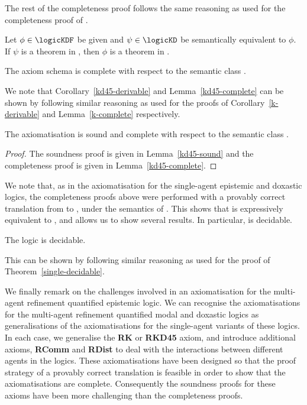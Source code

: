 The rest of the completeness proof follows the same reasoning as used for the
completeness proof of \axiomKF{}.

\begin{corollary}\label{kd45-derivable}
Let $\phi \in \logicKDF$ be given and $\psi \in \logicKD$ be semantically
equivalent to $\phi$.  If $\psi$ is a theorem in \logicKD{}, then $\phi$ is a
theorem in \axiomKDF{}.
\end{corollary}

\begin{lemma}\label{kd45-complete}
The axiom schema \axiomKDF{} is complete with respect to the semantic class
\classKD{}.
\end{lemma}

We note that Corollary~\ref{kd45-derivable} and Lemma~\ref{kd45-complete} can be
shown by following similar reasoning as used for the proofs of
Corollary~\ref{k-derivable} and Lemma~\ref{k-complete} respectively.

\begin{theorem}
The axiomatisation \axiomKDF{} is sound and complete with respect to the
semantic class \classKD{}.
\end{theorem}

\begin{proof}
The soundness proof is given in Lemma~\ref{kd45-sound} and the completeness
proof is given in Lemma~\ref{kd45-complete}.
\end{proof}

We note that, as in the axiomatisation for the single-agent epistemic and
doxastic logics, the completeness proofs above were performed with a provably
correct translation from \langF{} to \lang{}, under the semantics of
\logicKDF{}. This shows that \logicKDF{} is expressively equivalent to
\logicKD{}, and allows us to show several results. In particular, \logicKDF{} is
decidable.

\begin{theorem}
The logic \logicKDF{} is decidable.
\end{theorem}

This can be shown by following similar reasoning as used for the proof of
Theorem~\ref{single-decidable}.

We finally remark on the challenges involved in an axiomatisation for the
multi-agent refinement quantified epistemic logic. We can recognise the
axiomatisations for the multi-agent refinement quantified modal and doxastic
logics as generalisations of the axiomatisations for the single-agent variants
of these logics. In each case, we generalise the {\bf RK} or {\bf RKD45} axiom,
and introduce additional axioms, {\bf RComm} and {\bf RDist} to deal with the
interactions between different agents in the logics. These axiomatisations have
been designed so that the proof strategy of a provably correct translation is
feasible in order to show that the axiomatisations are complete. Consequently
the soundness proofs for these axioms have been more challenging than the
completeness proofs.

